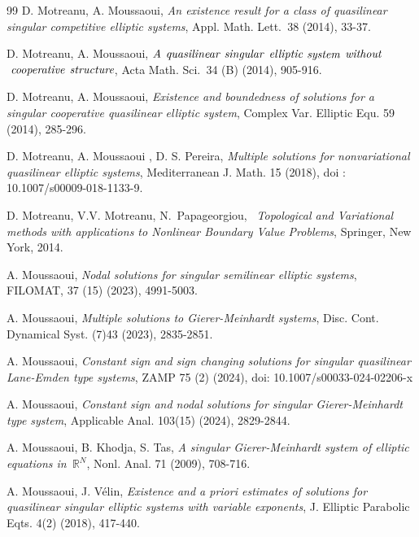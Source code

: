 \documentclass[11pt]{amsart}
\theoremstyle{definition}
\theoremstyle{remark}
\numberwithin{equation}{section}
\begin{document}
\begin{thebibliography}{99}
 D. Motreanu, A. Moussaoui, \emph{An existence result for a
class of quasilinear singular competitive elliptic systems}, Appl. Math.
Lett.\emph{\ }38 (2014), 33-37.

 D. Motreanu, A. Moussaoui, $\emph{A}$ $\emph{quasilinear}$ $%
\emph{singular}$ $\emph{elliptic}$ $\emph{system}$ $\emph{without}$ $\emph{\
cooperative}$ $\emph{structure}$, Acta Math. Sci.\emph{\ }34 (B) (2014),
905-916.

 D. Motreanu, A. Moussaoui, \emph{Existence and boundedness of
solutions for a singular cooperative quasilinear elliptic system}, Complex
Var. Elliptic Equ. 59 (2014), 285-296.

 D. Motreanu, A. Moussaoui , D. S. Pereira, \emph{Multiple
solutions for nonvariational quasilinear elliptic systems}, Mediterranean J.
Math. 15 (2018), doi : 10.1007/s00009-018-1133-9.

 D. Motreanu, V.V. Motreanu, N.\ Papageorgiou, \emph{\
Topological and Variational methods with applications to Nonlinear Boundary
Value Problems}, Springer, New York, 2014.

 A. Moussaoui, \emph{Nodal solutions for singular semilinear
elliptic systems}, FILOMAT, 37 (15) (2023), 4991-5003.

 A. Moussaoui, \emph{Multiple solutions to Gierer-Meinhardt
systems}, Disc. Cont. Dynamical Syst. (7)43 (2023), 2835-2851.

 A. Moussaoui, \emph{Constant sign and sign changing solutions
for singular quasilinear Lane-Emden type systems}, ZAMP 75 (2) (2024), doi:
10.1007/s00033-024-02206-x

 A. Moussaoui, \emph{Constant sign and nodal solutions for
singular Gierer-Meinhardt type system}, Applicable Anal. 103(15) (2024),
2829-2844.

 A. Moussaoui, B. Khodja, S. Tas, \emph{A singular
Gierer-Meinhardt system of elliptic equations in}\textit{\ }$%
\mathbb{R}
^{N}$, Nonl. Anal. 71 (2009), 708-716.

 A. Moussaoui, J. V\'{e}lin, \emph{Existence and a priori
estimates of solutions for quasilinear singular elliptic systems with
variable exponents}, J. Elliptic Parabolic Eqts. 4(2) (2018), 417-440.
\end{thebibliography}
\end{document}
